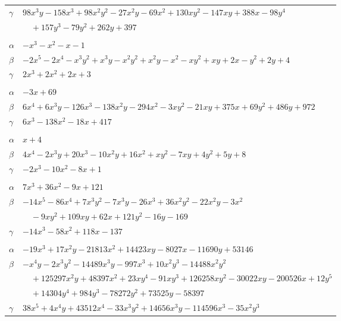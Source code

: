 \documentclass[11pt]{article}
\begin{document}
\begin{longtable}{@{}ll@{}}
$\gamma$ & $98x^{3}y-158x^{3}+98x^{2}y^{2}-27x^{2}y-69x^{2}+130xy^{2}-147xy+388x-98y^{4}$\\
 & $\quad +157y^{3}-79y^{2}+262y+397$\\
\addlinespace[3pt]
\multicolumn{2}{@{}l}{$\{i,j\}=\{13,23\}$, $k_{ij}=2^{2}$}\\
$\alpha$ & $-x^{3}-x^{2}-x-1$\\
$\beta$ & $-2x^{5}-2x^{4}-x^{3}y^{2}+x^{3}y-x^{2}y^{2}+x^{2}y-x^{2}-xy^{2}+xy+2x-y^{2}+2y+4$\\
$\gamma$ & $2x^{3}+2x^{2}+2x+3$\\
\addlinespace[3pt]
\multicolumn{2}{@{}l}{$\{i,j\}=\{13,43\}$, $k_{ij}=2^{2}\cdot 3\cdot 7\cdot 19$}\\
$\alpha$ & $-3x+69$\\
$\beta$ & $6x^{4}+6x^{3}y-126x^{3}-138x^{2}y-294x^{2}-3xy^{2}-21xy+375x+69y^{2}+486y+972$\\
$\gamma$ & $6x^{3}-138x^{2}-18x+417$\\
\addlinespace[3pt]
\multicolumn{2}{@{}l}{$\{i,j\}=\{13,76\}$, $k_{ij}=3\cdot 7$}\\
$\alpha$ & $x+4$\\
$\beta$ & $4x^{4}-2x^{3}y+20x^{3}-10x^{2}y+16x^{2}+xy^{2}-7xy+4y^{2}+5y+8$\\
$\gamma$ & $-2x^{3}-10x^{2}-8x+1$\\
\addlinespace[3pt]
\multicolumn{2}{@{}l}{$\{i,j\}=\{13,80\}$, $k_{ij}=3\cdot 19$}\\
$\alpha$ & $7x^{3}+36x^{2}-9x+121$\\
$\beta$ & $-14x^{5}-86x^{4}+7x^{3}y^{2}-7x^{3}y-26x^{3}+36x^{2}y^{2}-22x^{2}y-3x^{2}$\\
 & $\quad -9xy^{2}+109xy+62x+121y^{2}-16y-169$\\
$\gamma$ & $-14x^{3}-58x^{2}+118x-137$\\
\addlinespace[3pt]
\multicolumn{2}{@{}l}{$\{i,j\}=\{14,15\}$, $k_{ij}=2^{3}\cdot 7\cdot 13\cdot 31^{2}$}\\
$\alpha$ & $-19x^{3}+17x^{2}y-21813x^{2}+14423xy-8027x-11690y+53146$\\
$\beta$ & $-x^{4}y-2x^{3}y^{2}-14489x^{3}y-997x^{3}+10x^{2}y^{3}-14488x^{2}y^{2}$\\
 & $\quad +125297x^{2}y+48397x^{2}+23xy^{4}-91xy^{3}+126258xy^{2}-30022xy-200526x+12y^{5}$\\
 & $\quad +14304y^{4}+984y^{3}-78272y^{2}+73525y-58397$\\
$\gamma$ & $38x^{5}+4x^{4}y+43512x^{4}-33x^{3}y^{2}+14656x^{3}y-114596x^{3}-35x^{2}y^{3}$\\

\end{longtable}
\end{document}
